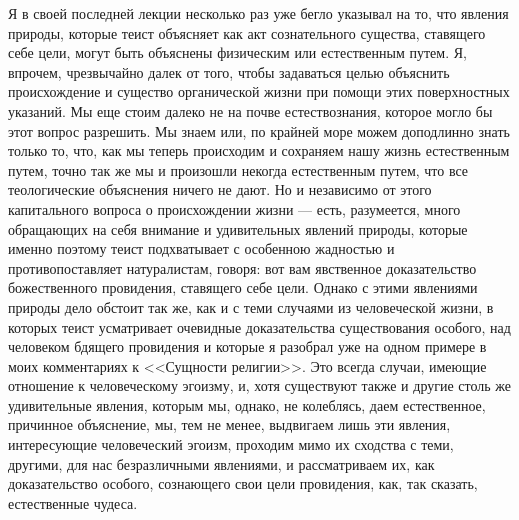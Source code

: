 \documentclass[12pt]{article}
\begin{document}
Я в своей последней лекции несколько раз уже бегло указывал на то, что явления природы, которые теист объясняет как акт сознательного существа, ставящего себе цели, могут быть объяснены физическим или естественным путем. Я, впрочем, чрезвычайно далек от того, чтобы задаваться целью объяснить происхождение и существо органической жизни при помощи этих поверхностных указаний. Мы еще стоим далеко не на почве естествознания, которое могло бы этот вопрос разрешить. Мы знаем или, по крайней море можем доподлинно знать только то, что, как мы теперь происходим и сохраняем нашу жизнь естественным путем, точно так же мы и произошли некогда естественным путем, что все теологические объяснения ничего не дают. Но и независимо от этого капитального вопроса о происхождении жизни --- есть, разумеется, много обращающих на себя внимание и удивительных явлений природы, которые именно поэтому теист подхватывает с особенною жадностью и противопоставляет натуралистам, говоря: вот вам явственное доказательство божественного провидения, ставящего себе цели. Однако с этими явлениями природы дело обстоит так же, как и с теми случаями из человеческой жизни, в которых теист усматривает очевидные доказательства существования особого, над человеком бдящего провидения и которые я разобрал уже на одном примере в моих комментариях к <<Сущности религии>>. Это всегда случаи, имеющие отношение к человеческому эгоизму, и, хотя существуют также и другие столь же удивительные явления, которым мы, однако, не колеблясь, даем естественное, причинное объяснение, мы, тем не менее, выдвигаем лишь эти явления, интересующие человеческий эгоизм, проходим мимо их сходства с теми, другими, для нас безразличными явлениями, и рассматриваем их, как доказательство особого, сознающего свои цели провидения, как, так сказать, естественные чудеса. 
\end{document}
